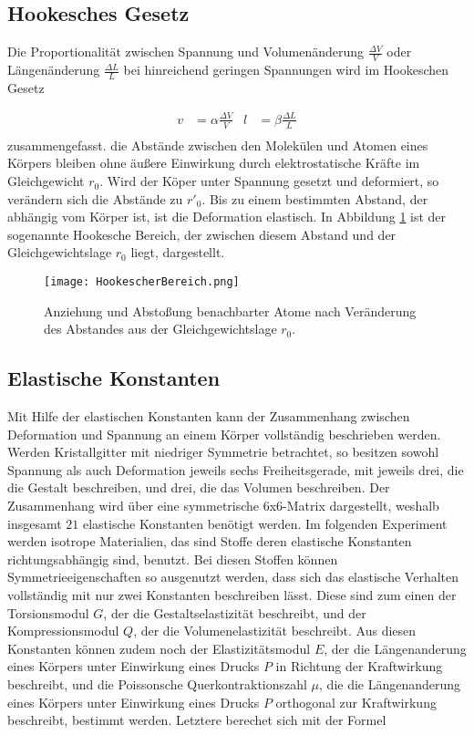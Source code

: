 \subsection{Hookesches Gesetz}

Die Proportionalität zwischen Spannung und Volumenänderung
$\frac{\Delta V}{V}$ oder
Längenänderung $\frac{\Delta L}{L}$ bei hinreichend geringen Spannungen
wird im Hookeschen Gesetz

\begin{align}
  v & = \alpha \frac{\Delta V}{V} & l & = \beta \frac{\Delta L}{L} \\
  \label{eqn:Hooke}
\end{align}
zusammengefasst.
die Abstände zwischen den Molekülen und Atomen eines Körpers bleiben ohne
äußere Einwirkung durch elektrostatische Kräfte im Gleichgewicht $r_0$.
Wird der Köper unter Spannung gesetzt und deformiert, so verändern sich die
Abstände zu $r'_0$.
Bis zu einem bestimmten Abstand, der abhängig vom Körper ist, ist die
Deformation elastisch.
In Abbildung \ref{fig:HookBe} ist der sogenannte Hookesche Bereich, der zwischen
diesem Abstand und der Gleichgewichtslage $r_0$ liegt, dargestellt.

\begin{figure}[h]
  \centering
  \texttt{[image: HookescherBereich.png]}
  \caption{Anziehung und Abstoßung benachbarter Atome nach Veränderung des
  Abstandes aus der Gleichgewichtslage $r_0$.}
  \label{fig:HookBe}
\end{figure}


\subsection{Elastische Konstanten}

Mit Hilfe der elastischen Konstanten kann der Zusammenhang zwischen
Deformation und Spannung an einem Körper vollständig beschrieben werden.
Werden Kristallgitter mit niedriger Symmetrie betrachtet, so besitzen sowohl
Spannung als auch Deformation jeweils sechs Freiheitsgerade, mit jeweils
drei, die die Gestalt beschreiben, und drei, die das Volumen beschreiben.
Der Zusammenhang wird über eine symmetrische 6x6-Matrix dargestellt,
weshalb insgesamt $21$ elastische Konstanten benötigt werden.
Im folgenden Experiment werden isotrope Materialien, das sind Stoffe deren
elastische Konstanten richtungsabhängig sind, benutzt.
Bei diesen Stoffen können Symmetrieeigenschaften so ausgenutzt werden,
dass sich das elastische Verhalten vollständig mit nur zwei Konstanten
beschreiben lässt.
Diese sind zum einen der Torsionsmodul $G$, der die
Gestaltselastizität beschreibt, und
der Kompressionsmodul $Q$, der die Volumenelastizität beschreibt.
Aus diesen Konstanten können zudem noch der Elastizitätsmodul $E$, der die
Längenanderung eines Körpers unter Einwirkung eines Drucks $P$ in Richtung
der Kraftwirkung beschreibt, und die Poissonsche Querkontraktionszahl $\mu$,
die die Längenanderung eines Körpers unter Einwirkung eines Drucks $P$
orthogonal zur Kraftwirkung beschreibt, bestimmt werden.
Letztere berechet sich mit der Formel

